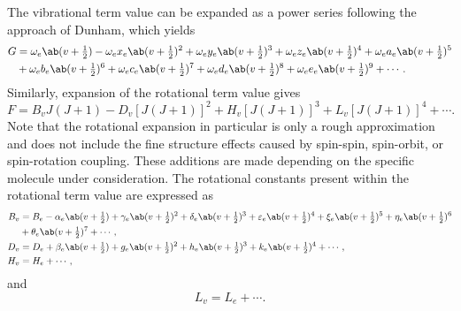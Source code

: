 \documentclass[11pt, twoside, fleqn]{report}
\begin{document}
The vibrational term value can be expanded as a power series following the approach of Dunham, which yields \cite{babouHighTemperatureNonequilibriumPartition2009}
\begin{align*}
    G & = \omega_e\ab(v + \tfrac{1}{2}) - \omega_ex_e\ab(v + \tfrac{1}{2})^2 + \omega_ey_e\ab(v + \tfrac{1}{2})^3 + \omega_ez_e\ab(v + \tfrac{1}{2})^4 + \omega_ea_e\ab(v + \tfrac{1}{2})^5 \\
    & + \omega_eb_e\ab(v + \tfrac{1}{2})^6 + \omega_ec_e\ab(v + \tfrac{1}{2})^7 + \omega_ed_e\ab(v + \tfrac{1}{2})^8 + \omega_ee_e\ab(v + \tfrac{1}{2})^9 + \dotsb.
\end{align*}
Similarly, expansion of the rotational term value gives
\begin{equation*}
    F = B_vJ(J + 1) - D_v[J(J + 1)]^2 + H_v[J(J + 1)]^3 + L_v[J(J + 1)]^4 + \dotsb.
\end{equation*}
Note that the rotational expansion in particular is only a rough approximation and does not include the fine structure effects caused by spin-spin, spin-orbit, or spin-rotation coupling. These additions are made depending on the specific molecule under consideration. The rotational constants present within the rotational term value are expressed as
\begin{align*}
    B_v & = B_e - \alpha_e\ab(v + \tfrac{1}{2}) + \gamma_e\ab(v + \tfrac{1}{2})^2 + \delta_e\ab(v + \tfrac{1}{2})^3 + \varepsilon_e\ab(v + \tfrac{1}{2})^4 + \xi_e\ab(v + \tfrac{1}{2})^5 + \eta_e\ab(v + \tfrac{1}{2})^6 \\
    & + \theta_e\ab(v + \tfrac{1}{2})^7 + \dotsb,                                                                                                                                                                                         \\
    D_v & = D_e + \beta_e\ab(v + \tfrac{1}{2}) + g_e\ab(v + \tfrac{1}{2})^2 + h_e\ab(v + \tfrac{1}{2})^3 + k_e\ab(v + \tfrac{1}{2})^4 + \dotsb,                                                                                   \\
    H_v & = H_e + \dotsb,
\end{align*}
and
\begin{equation*}
    L_v = L_e + \dotsb.
\end{equation*}
\end{document}
